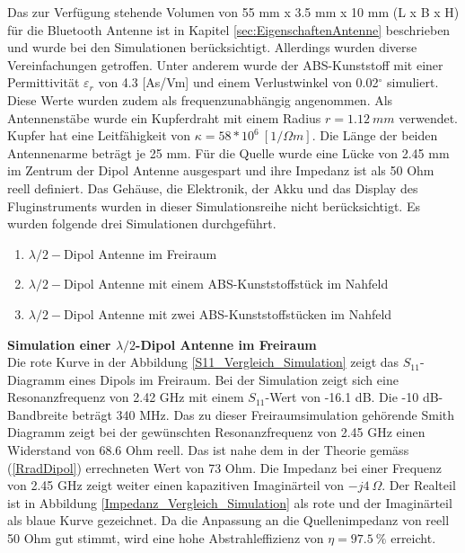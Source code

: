 Das zur Verfügung stehende Volumen von 55 mm x 3.5 mm x 10 mm (L x B x H) für die Bluetooth Antenne ist in Kapitel \ref{sec:EigenschaftenAntenne} beschrieben und wurde bei den Simulationen berücksichtigt. Allerdings wurden diverse Vereinfachungen getroffen. Unter anderem wurde der ABS-Kunststoff mit einer Permittivität $\varepsilon_r $ von 4.3 [As/Vm] und einem Verlustwinkel von 0.02$^\circ$ simuliert. Diese Werte wurden zudem als frequenzunabhängig angenommen. Als Antennenstäbe wurde ein Kupferdraht mit einem Radius $r = 1.12\ mm$ verwendet. Kupfer hat eine Leitfähigkeit von $\kappa=58*10^{6}\ [1/\Omega m]$. Die Länge der beiden Antennenarme beträgt je 25 mm. Für die Quelle wurde eine Lücke von 2.45 mm im Zentrum der Dipol Antenne ausgespart und ihre Impedanz ist als 50 Ohm reell definiert. Das Gehäuse, die Elektronik, der Akku und das Display des Fluginstruments wurden in dieser Simulationsreihe nicht berücksichtigt. Es wurden folgende drei Simulationen durchgeführt.
\begin{enumerate}
\item $\lambda/2-$Dipol Antenne im Freiraum
\item $\lambda/2-$Dipol Antenne mit einem ABS-Kunststoffstück im Nahfeld
\item $\lambda/2-$Dipol Antenne mit zwei ABS-Kunststoffstücken im Nahfeld
\end{enumerate}

\textbf{Simulation einer $\lambda/2$-Dipol Antenne im Freiraum}\\
Die rote Kurve in der Abbildung \ref{S11_Vergleich_Simulation} zeigt das $S_{11}$-Diagramm eines Dipols im Freiraum. Bei der Simulation zeigt sich eine Resonanzfrequenz von 2.42 GHz mit einem $S_{11}$-Wert von -16.1 dB. Die -10 dB-Bandbreite beträgt 340 MHz. Das zu dieser Freiraumsimulation gehörende Smith Diagramm zeigt bei der gewünschten Resonanzfrequenz von 2.45 GHz einen Widerstand von 68.6 Ohm reell. Das ist nahe dem in der Theorie gemäss (\ref{RradDipol}) errechneten Wert von 73 Ohm. Die Impedanz bei einer Frequenz von 2.45 GHz zeigt weiter einen kapazitiven Imaginärteil von $-j4\ \Omega$. Der Realteil ist in Abbildung \ref{Impedanz_Vergleich_Simulation} als rote und der Imaginärteil als blaue Kurve gezeichnet. Da die Anpassung an die Quellenimpedanz von reell 50 Ohm gut stimmt, wird eine hohe Abstrahleffizienz von $\eta = 97.5 \ \% $ erreicht.\\



